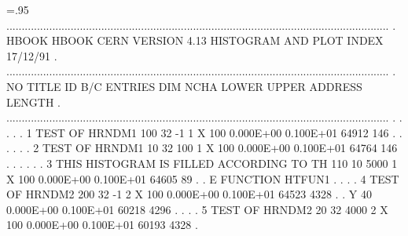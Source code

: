 \begin{Listing}\baselineskip=.95\baselineskip\relax
 .............................................................................................................................
 .   HBOOK   HBOOK  CERN            VERSION   4.13       HISTOGRAM AND PLOT INDEX                             17/12/91       .
 .............................................................................................................................
 .  NO                     TITLE                      ID  B/C  ENTRIES DIM   NCHA     LOWER       UPPER       ADDRESS LENGTH .
 .............................................................................................................................
 .                                                                                                                           .
 .                                                                                                                           .
 .   1  TEST OF HRNDM1                               100  32       -1  1  X   100   0.000E+00   0.100E+01       64912    146 .
 .                                                                                                                           .
 .                                                                                                                           .
 .   2  TEST OF HRNDM1                                10  32      100  1  X   100   0.000E+00   0.100E+01       64764    146 .
 .                                                                                                                           .
 .                                                                                                                           .
 .   3  THIS HISTOGRAM IS FILLED ACCORDING TO TH     110  10     5000  1  X   100   0.000E+00   0.100E+01       64605     89 .
 .      E FUNCTION HTFUN1                                                                                                    .
 .                                                                                                                           .
 .   4  TEST OF HRNDM2                               200  32       -1  2  X   100   0.000E+00   0.100E+01       64523   4328 .
 .                                                                        Y    40   0.000E+00   0.100E+01       60218   4296 .
 .                                                                                                                           .
 .   5  TEST OF HRNDM2                                20  32     4000  2  X   100   0.000E+00   0.100E+01       60193   4328 .

\end{Listing}
